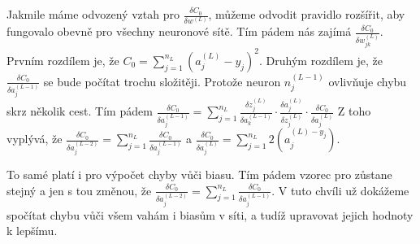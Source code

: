 Jakmile máme odvozený vztah pro \(\frac{\delta C_0}{\delta w^{(L)}}\), můžeme odvodit pravidlo rozšířit, aby fungovalo obevně pro všechny neuronové sítě.
Tím pádem nás zajímá \(\frac{\delta C_0}{\delta w_{jk}^{(L)}}\). Prvním rozdílem je, že \(C_0 = \sum_{j=1}^{n_L}(a_j^{(L)} - y_j)^2 \).
Druhým rozdílem je, že \(\frac{\delta C_0}{\delta a_j^{(L-1)}}\) se bude počítat trochu složitěji. Protože neuron \(n_j^{(L-1)}\) ovlivňuje chybu skrz několik cest.
Tím pádem \(\frac{\delta C_0}{\delta a_j^{(L-1)}} = \sum_{j=1}^{n_L} \frac{\delta z_j^{(L)}}{\delta a_k^{(L-1)}} \cdot \frac{\delta a_j^{(L)}}{\delta z_j^{(L)}} \cdot \frac{\delta C_0}{\delta a_j^(L)}\)
Z toho vyplývá, že \(\frac{\delta C_0}{\delta a_j^{(L-2)}} = \sum_{j=1}^{n_L} \frac{\delta C_0}{\delta a_j^{(L-1)}} \) a \(\frac{\delta C_0}{\delta a_j^{(L)}} = \sum_{j=1}^{n_L} 2(a_j^{(L) - y_j})\).

To samé platí i pro výpočet chyby vůči biasu. Tím pádem vzorec pro zůstane stejný a jen s tou změnou, že \(\frac{\delta C_0}{\delta a_j^{(L-2)}} = \sum_{j=1}^{n_L} \frac{\delta C_0}{\delta a_j^{(L-1)}} \).
V tuto chvíli už dokážeme spočítat chybu vůči všem vahám i biasům v síti, a tudíž upravovat jejich hodnoty k lepšímu.